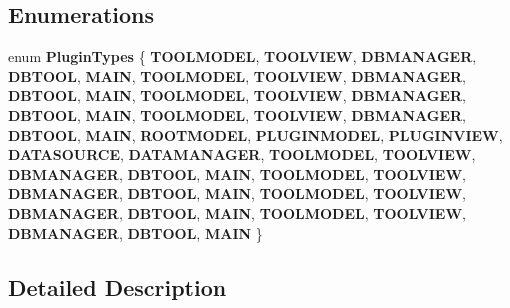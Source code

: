 \subsection*{Enumerations}
\begin{DoxyCompactItemize}
\item 
\mbox{\label{group__key__interfaces_ga9b3bee49ce70df90694056c2f48c2e77}} 
enum {\bfseries Plugin\+Types} \{ \newline
{\bfseries T\+O\+O\+L\+M\+O\+D\+EL}, 
{\bfseries T\+O\+O\+L\+V\+I\+EW}, 
{\bfseries D\+B\+M\+A\+N\+A\+G\+ER}, 
{\bfseries D\+B\+T\+O\+OL}, 
\newline
{\bfseries M\+A\+IN}, 
{\bfseries T\+O\+O\+L\+M\+O\+D\+EL}, 
{\bfseries T\+O\+O\+L\+V\+I\+EW}, 
{\bfseries D\+B\+M\+A\+N\+A\+G\+ER}, 
\newline
{\bfseries D\+B\+T\+O\+OL}, 
{\bfseries M\+A\+IN}, 
{\bfseries T\+O\+O\+L\+M\+O\+D\+EL}, 
{\bfseries T\+O\+O\+L\+V\+I\+EW}, 
\newline
{\bfseries D\+B\+M\+A\+N\+A\+G\+ER}, 
{\bfseries D\+B\+T\+O\+OL}, 
{\bfseries M\+A\+IN}, 
{\bfseries T\+O\+O\+L\+M\+O\+D\+EL}, 
\newline
{\bfseries T\+O\+O\+L\+V\+I\+EW}, 
{\bfseries D\+B\+M\+A\+N\+A\+G\+ER}, 
{\bfseries D\+B\+T\+O\+OL}, 
{\bfseries M\+A\+IN}, 
\newline
{\bfseries R\+O\+O\+T\+M\+O\+D\+EL}, 
{\bfseries P\+L\+U\+G\+I\+N\+M\+O\+D\+EL}, 
{\bfseries P\+L\+U\+G\+I\+N\+V\+I\+EW}, 
{\bfseries D\+A\+T\+A\+S\+O\+U\+R\+CE}, 
\newline
{\bfseries D\+A\+T\+A\+M\+A\+N\+A\+G\+ER}, 
{\bfseries T\+O\+O\+L\+M\+O\+D\+EL}, 
{\bfseries T\+O\+O\+L\+V\+I\+EW}, 
{\bfseries D\+B\+M\+A\+N\+A\+G\+ER}, 
\newline
{\bfseries D\+B\+T\+O\+OL}, 
{\bfseries M\+A\+IN}, 
{\bfseries T\+O\+O\+L\+M\+O\+D\+EL}, 
{\bfseries T\+O\+O\+L\+V\+I\+EW}, 
\newline
{\bfseries D\+B\+M\+A\+N\+A\+G\+ER}, 
{\bfseries D\+B\+T\+O\+OL}, 
{\bfseries M\+A\+IN}, 
{\bfseries T\+O\+O\+L\+M\+O\+D\+EL}, 
\newline
{\bfseries T\+O\+O\+L\+V\+I\+EW}, 
{\bfseries D\+B\+M\+A\+N\+A\+G\+ER}, 
{\bfseries D\+B\+T\+O\+OL}, 
{\bfseries M\+A\+IN}, 
\newline
{\bfseries T\+O\+O\+L\+M\+O\+D\+EL}, 
{\bfseries T\+O\+O\+L\+V\+I\+EW}, 
{\bfseries D\+B\+M\+A\+N\+A\+G\+ER}, 
{\bfseries D\+B\+T\+O\+OL}, 
\newline
{\bfseries M\+A\+IN}
 \}
\end{DoxyCompactItemize}


\subsection{Detailed Description}
